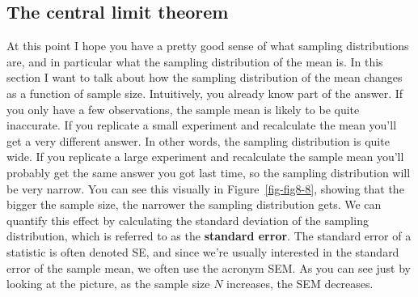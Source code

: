 \documentclass[
  a4paper,
]{book}
\begin{document}
\hypertarget{sec-The-central-limit-theorem}{%
\subsection{The central limit
theorem}\label{sec-The-central-limit-theorem}}

At this point I hope you have a pretty good sense of what sampling
distributions are, and in particular what the sampling distribution of
the mean is. In this section I want to talk about how the sampling
distribution of the mean changes as a function of sample size.
Intuitively, you already know part of the answer. If you only have a few
observations, the sample mean is likely to be quite inaccurate. If you
replicate a small experiment and recalculate the mean you'll get a very
different answer. In other words, the sampling distribution is quite
wide. If you replicate a large experiment and recalculate the sample
mean you'll probably get the same answer you got last time, so the
sampling distribution will be very narrow. You can see this visually in
Figure~\ref{fig-fig8-8}, showing that the bigger the sample size, the
narrower the sampling distribution gets. We can quantify this effect by
calculating the standard deviation of the sampling distribution, which
is referred to as the \textbf{standard error}. The standard error of a
statistic is often denoted SE, and since we're usually interested in the
standard error of the sample mean, we often use the acronym SEM. As you
can see just by looking at the picture, as the sample size \(N\)
increases, the SEM decreases.
\end{document}
